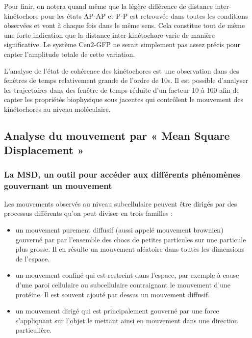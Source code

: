\documentclass[12pt,a4paper,twoside,openright]{book}
\begin{document}
Pour finir, on notera quand même que la légère différence de distance
inter-kinétochore pour les états AP-AP et P-P est retrouvée dans toutes
les conditions observées et vont à chaque fois dans le même sens. Cela
constitue tout de même une forte indication que la distance
inter-kinétochore varie de manière significative. Le système Cen2-GFP ne
serait simplement pas assez précis pour capter l'amplitude totale de
cette variation.

L'analyse de l'état de cohérence des kinétochores est une observation
dans des fenêtres de temps relativement grande de l'ordre de 10s. Il est
possible d'analyser les trajectoires dans des fenêtre de temps réduite
d'un facteur 10 à 100 afin de capter les propriétés biophysique sous
jacentes qui contrôlent le mouvement des kinétochores au niveau
moléculaire.

\subsection{Analyse du mouvement par « Mean Square Displacement
»}\label{analyse-du-mouvement-par-mean-square-displacement}

\subsubsection{La MSD, un outil pour accéder aux différents phénomènes
gouvernant un
mouvement}\label{la-msd-un-outil-pour-accuxe9der-aux-diffuxe9rents-phuxe9nomuxe8nes-gouvernant-un-mouvement}

Les mouvements observés au niveau subcellulaire peuvent être dirigés par
des processus différents qu'on peut diviser en trois familles :

\begin{itemize}
\item
  un mouvement purement diffusif (aussi appelé mouvement brownien)
  gouverné par par l'ensemble des chocs de petites particules sur une
  particule plus grosse. Il en résulte un mouvement aléatoire dans
  toutes les dimensions de l'espace.
\item
  un mouvement confiné qui est restreint dans l'espace, par exemple à
  cause d'une paroi cellulaire ou subcellulaire contraignant le
  mouvement d'une protéine. Il est souvent ajouté par dessus un
  mouvement diffusif.
\item
  un mouvement dirigé qui est principalement gouverné par une force
  s'appliquant sur l'objet le mettant ainsi en mouvement dans une
  direction particulière.
\end{itemize}
\end{document}
